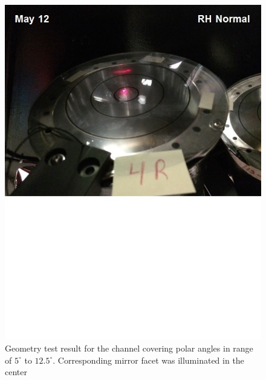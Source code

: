 \begin{figure}[h]
    \centering
    \includegraphics[width=1.0\linewidth,trim={0 8.5cm 0 0},clip]{images/GEO_TEST_4_Normal.jpg}
    \caption{Geometry test result for the channel covering polar angles in range of $5^\circ$ to $12.5^\circ$. Corresponding mirror facet was illuminated in the center}
    \label{fig:GEO_TEST_4_Normal}
\end{figure}


